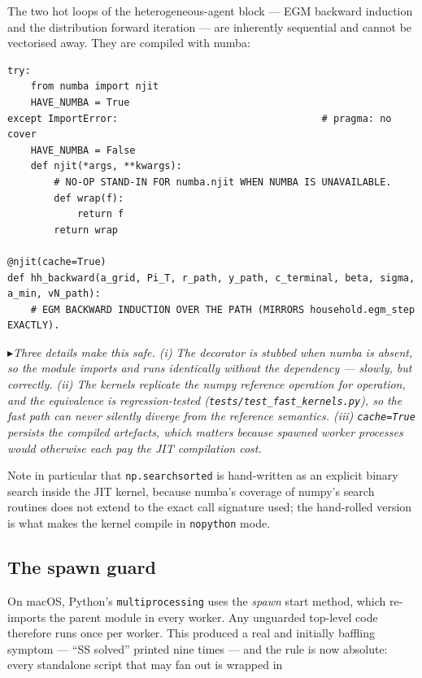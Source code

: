 \documentclass[11pt]{article}
\numberwithin{equation}{section}
\newcommand{\code}[1]{\texttt{\small #1}}
\theoremstyle{definition}
\theoremstyle{plain}
\theoremstyle{remark}
\newcommand{\trick}[1]{\par\smallskip\noindent
  \textcolor{notec}{$\blacktriangleright$}\;\emph{#1}\par\smallskip}
\begin{document}
The two hot loops of the heterogeneous-agent block --- EGM backward induction and the
distribution forward iteration --- are inherently sequential and cannot be vectorised
away. They are compiled with numba:

\begin{lstlisting}[caption={JIT with a transparent fallback. \code{fast\_kernels.py}.}]
try:
    from numba import njit
    HAVE_NUMBA = True
except ImportError:                                   # pragma: no cover
    HAVE_NUMBA = False
    def njit(*args, **kwargs):
        # NO-OP STAND-IN FOR numba.njit WHEN NUMBA IS UNAVAILABLE.
        def wrap(f):
            return f
        return wrap

@njit(cache=True)
def hh_backward(a_grid, Pi_T, r_path, y_path, c_terminal, beta, sigma, a_min, vN_path):
    # EGM BACKWARD INDUCTION OVER THE PATH (MIRRORS household.egm_step EXACTLY).
\end{lstlisting}

\trick{Three details make this safe. (i) The decorator is \emph{stubbed} when numba
is absent, so the module imports and runs identically without the dependency ---
slowly, but correctly. (ii) The kernels replicate the numpy reference operation for
operation, and the equivalence is regression-tested
(\code{tests/test\_fast\_kernels.py}), so the fast path can never silently diverge
from the reference semantics. (iii) \code{cache=True} persists the compiled
artefacts, which matters because spawned worker processes would otherwise each pay
the JIT compilation cost.}

Note in particular that \code{np.searchsorted} is hand-written as an explicit binary
search inside the JIT kernel, because numba's coverage of numpy's search routines
does not extend to the exact call signature used; the hand-rolled version is what
makes the kernel compile in \code{nopython} mode.

\subsection{The spawn guard}

On macOS, Python's \code{multiprocessing} uses the \emph{spawn} start method, which
re-imports the parent module in every worker. Any unguarded top-level code therefore
runs once per worker. This produced a real and initially baffling symptom --- ``SS
solved'' printed nine times --- and the rule is now absolute: every standalone script
that may fan out is wrapped in
\end{document}
